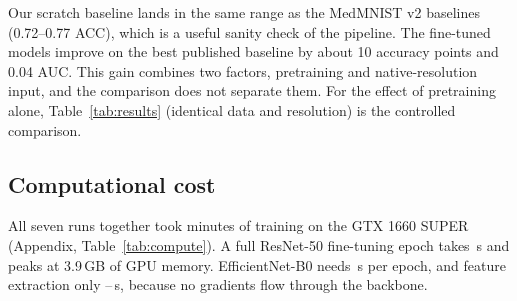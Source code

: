 Our scratch baseline lands in the same range as the MedMNIST v2 baselines (0.72--0.77 ACC), which is a useful
sanity check of the pipeline. The fine-tuned models improve on the best published baseline by about
10 accuracy points and 0.04 AUC. This gain combines two factors, pretraining and native-resolution input, and
the comparison does not separate them. For the effect of pretraining alone, Table~\ref{tab:results} (identical
data and resolution) is the controlled comparison.

\subsection{Computational cost}
All seven runs together took \TotalTrainMin{} minutes of training on the GTX 1660 SUPER (Appendix,
Table~\ref{tab:compute}). A full ResNet-50 fine-tuning epoch takes \RFineEpochTime\,s and peaks at 3.9\,GB of GPU
memory. EfficientNet-B0 needs \EFineEpochTime\,s per epoch, and feature extraction only \EFrozenEpochTime--\RFrozenEpochTime\,s,
because no gradients flow through the backbone.
